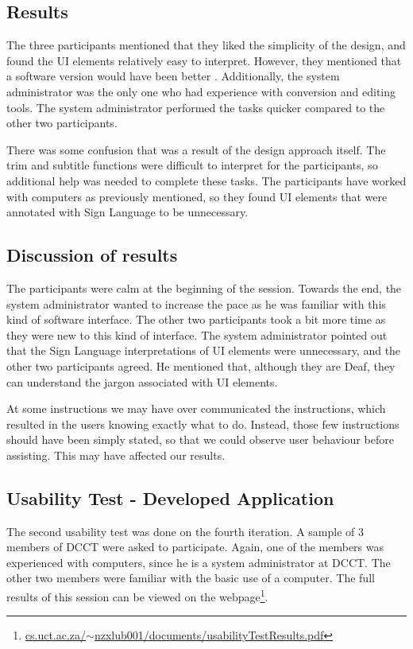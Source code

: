 \documentclass{sig-alternate-05-2015}
\begin{document}
\subsection*{Results}
The three participants mentioned that they liked the simplicity of the design, and found the UI elements relatively easy to interpret. However, they mentioned that a software version would have been better \cite{sefelin2003paper}. Additionally, the system administrator was the only one who had experience with conversion and editing tools. The system administrator performed the tasks quicker compared to the other two participants.

There was some confusion that was a result of the design approach itself. The trim and subtitle functions were difficult to interpret for the participants, so additional help was needed to complete these tasks. The participants have worked with computers as previously mentioned, so they found UI elements that were annotated with Sign Language to be unnecessary.

\subsection*{Discussion of results}
The participants were calm at the beginning of the session. Towards the end, the system administrator wanted to increase the pace as he was familiar with this kind of software interface. The other two participants took a bit more time as they were new to this kind of interface. The system administrator pointed out that the Sign Language interpretations of UI elements were unnecessary, and the other two participants agreed. He mentioned that, although they are Deaf, they can understand the jargon associated with UI elements.

At some instructions we may have over communicated the instructions, which resulted in the users knowing exactly what to do. Instead, those few instructions should have been simply stated, so that we could observe user behaviour before assisting. This may have affected our results.

\subsection{Usability Test - Developed Application}\label{Developed Application}
The second usability test was done on the fourth iteration. A sample of 3 members of DCCT were asked to participate. Again, one of the members was experienced with computers, since he is a system administrator at DCCT. The other two members were familiar with the basic use of a computer. The full results of this session can be viewed on the webpage\footnote{\href{http://people.cs.uct.ac.za/~nzxlub001/documents/usabilityTestResults.pdf}{cs.uct.ac.za/$\sim$nzxlub001/documents/usabilityTestResults.pdf}}.
\end{document}
